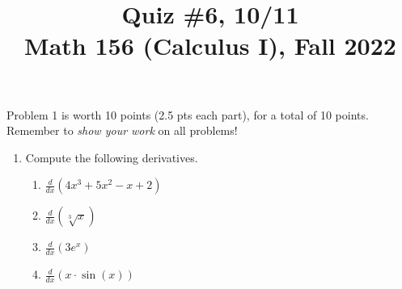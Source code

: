 \documentclass[11pt]{article}
\title{Quiz \#6, 10/11 \\ Math 156 (Calculus I), Fall 2022}
\date{}
\begin{document}
\maketitle

\thispagestyle{empty}

\vspace{-1cm}

Problem 1 is worth 10 points (2.5 pts each part), for a total of 10 points. Remember to \emph{show your work} on all problems!

\begin{enumerate}
\item Compute the following derivatives.
\begin{enumerate}
\item $\displaystyle \frac{d}{dx} ( 4x^3 + 5x^2 - x + 2)$
\item $\displaystyle \frac{d}{dx} ( \sqrt[3]{x}) $
\item $\displaystyle \frac{d}{dx} ( 3e^{x}) $
\item $\displaystyle \frac{d}{dx} ( x \cdot \sin(x) )$
\end{enumerate}
\end{enumerate}
\end{document}
